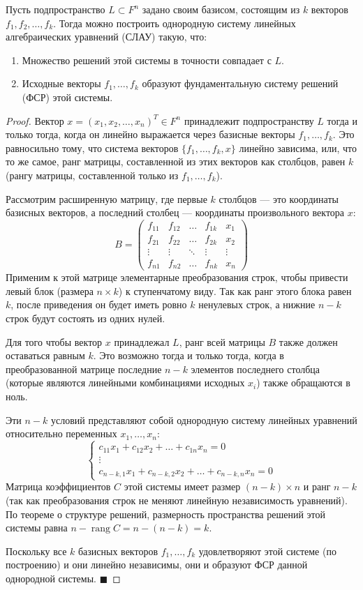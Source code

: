 \begin{theorem}
Пусть подпространство $L \subset F^n$ задано своим базисом, состоящим из $k$ векторов $f_1, f_2, \dots, f_k$. Тогда можно построить однородную систему линейных алгебраических уравнений (СЛАУ) такую, что:
\begin{enumerate}
    \item Множество решений этой системы в точности совпадает с $L$.
    \item Исходные векторы $f_1, \dots, f_k$ образуют фундаментальную систему решений (ФСР) этой системы.
\end{enumerate}
\end{theorem}

\begin{proof}
Вектор $x = (x_1, x_2, \dots, x_n)^T \in F^n$ принадлежит подпространству $L$ тогда и только тогда, когда он линейно выражается через базисные векторы $f_1, \dots, f_k$. Это равносильно тому, что система векторов $\{f_1, \dots, f_k, x\}$ линейно зависима, или, что то же самое, ранг матрицы, составленной из этих векторов как столбцов, равен $k$ (рангу матрицы, составленной только из $f_1, \dots, f_k$).

Рассмотрим расширенную матрицу, где первые $k$ столбцов --- это координаты базисных векторов, а последний столбец --- координаты произвольного вектора $x$:
\[
B = \left( \begin{array}{cccc|c}
f_{11} & f_{12} & \dots & f_{1k} & x_1 \\
f_{21} & f_{22} & \dots & f_{2k} & x_2 \\
\vdots & \vdots & \ddots & \vdots & \vdots \\
f_{n1} & f_{n2} & \dots & f_{nk} & x_n
\end{array} \right)
\]
Применим к этой матрице элементарные преобразования строк, чтобы привести левый блок (размера $n \times k$) к ступенчатому виду. Так как ранг этого блока равен $k$, после приведения он будет иметь ровно $k$ ненулевых строк, а нижние $n - k$ строк будут состоять из одних нулей.

Для того чтобы вектор $x$ принадлежал $L$, ранг всей матрицы $B$ также должен оставаться равным $k$. Это возможно тогда и только тогда, когда в преобразованной матрице последние $n - k$ элементов последнего столбца (которые являются линейными комбинациями исходных $x_i$) также обращаются в ноль. 

Эти $n - k$ условий представляют собой однородную систему линейных уравнений относительно переменных $x_1, \dots, x_n$:
\[
\begin{cases}
c_{11}x_1 + c_{12}x_2 + \dots + c_{1n}x_n = 0 \\
\vdots \\
c_{n-k, 1}x_1 + c_{n-k, 2}x_2 + \dots + c_{n-k, n}x_n = 0
\end{cases}
\]
Матрица коэффициентов $C$ этой системы имеет размер $(n-k) \times n$ и ранг $n-k$ (так как преобразования строк не меняют линейную независимость уравнений). По теореме о структуре решений, размерность пространства решений этой системы равна $n - \operatorname{rang} C = n - (n - k) = k$. 

Поскольку все $k$ базисных векторов $f_1, \dots, f_k$ удовлетворяют этой системе (по построению) и они линейно независимы, они и образуют ФСР данной однородной системы.
\hfill$\blacksquare$
\end{proof}
